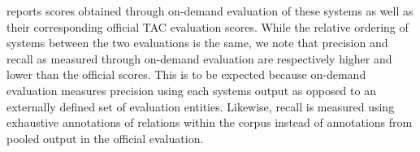  reports scores obtained through on-demand evaluation of these systems as well as their corresponding official TAC evaluation scores.
While the relative ordering of systems between the two evaluations is the same, we note that precision and recall as measured through on-demand evaluation are respectively higher and lower than the official scores.
This is to be expected because on-demand evaluation measures precision using each systems output as opposed to an externally defined set of evaluation entities.
Likewise, recall is measured using exhaustive annotations of relations within the corpus instead of annotations from pooled output in the official evaluation.  


